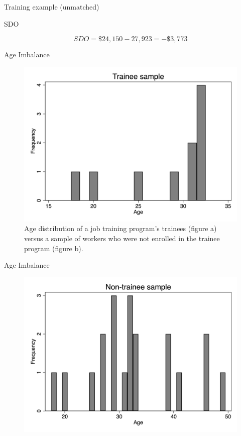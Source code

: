 \documentclass{beamer}
\begin{document}
\begin{frame}{Training example (unmatched)}
\end{frame}

\begin{frame}{SDO}

\begin{equation}
SDO = \$24,150-27,923 = -\$3,773
\end{equation}

\end{frame}


\begin{frame}{Age Imbalance}

\begin{figure}[!t]\centering
\caption{Age distribution of a job training program's trainees (figure a) versus a sample of workers who were not enrolled in the trainee program (figure b).}
\includegraphics[scale=0.075]{./lecture_includes/trainees.jpg}
\end{figure}

\end{frame}

\begin{frame}{Age Imbalance}

\begin{figure}[!t]\centering
\includegraphics[scale=0.075]{./lecture_includes/nontrainees}
\end{figure}

\end{frame}
\end{document}
